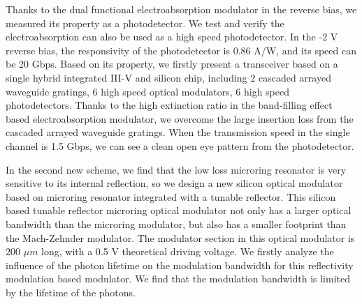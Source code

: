 \begin{englishabstract}
Thanks to the dual functional  electroabsorption modulator in the reverse bias, we measured its property as a photodetector. We test and verify the electroabsorption can also be used as a high speed photodetector. In the -2 V reverse bias, the responsivity of the photodetector is 0.86 A/W, and its speed can be 20 Gbps. Based on its property, we firstly present a transceiver based on a single hybrid integrated III-V and silicon chip, including 2 cascaded arrayed waveguide gratings, 6 high speed optical modulators, 6 high speed photodetectors. Thanks to the high extinction ratio in the band-filling effect based electroabsorption modulator, we overcome the large insertion loss from the cascaded arrayed waveguide gratings. When the transmission speed in the single channel is 1.5 Gbps, we can see a clean open eye pattern from the photodetector.

In the second new scheme, we find that the low loss microring resonator is very sensitive to its internal reflection, so we design a new silicon optical modulator based on microring resonator integrated with a tunable reflector. This silicon based tunable reflector microring optical modulator not only has a larger optical bandwidth than the microring modulator, but also has a smaller footprint than the Mach-Zehnder modulator. The modulator section in this optical modulator is 200 $\mu m$ long, with a 0.5 V theoretical driving voltage. We firstly analyze the influence of the photon lifetime on the modulation bandwidth for this reflectivity modulation based modulator. We find that the modulation bandwidth is limited by the lifetime of the photons.


\end{englishabstract}
